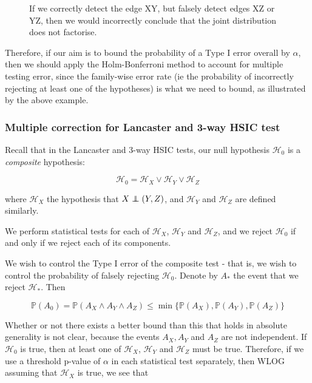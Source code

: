 \documentclass[12pt]{article}
\newcommand\independent{\protect\mathpalette{\protect\independenT}{\perp}}
\def\independenT#1#2{\mathrel{\rlap{$#1#2$}\mkern2mu{#1#2}}}
\numberwithin{claim}{section}
\numberwithin{lemma}{section}
\numberwithin{theorem}{section}
\begin{document}
\begin{figure}
\centering
{}
\caption{If we correctly detect the edge XY, but falsely detect edges XZ or YZ, then we would incorrectly conclude that the joint distribution does not factorise.\label{fig:example}}
\end{figure}

Therefore, if our aim is to bound the probability of a Type I error overall by $\alpha$, then we should apply the Holm-Bonferroni method to account for multiple testing error, since the family-wise error rate (ie the probability of incorrectly rejecting at least one of the hypotheses) is what we need to bound, as illustrated by the above example.

\subsubsection{Multiple correction for Lancaster and 3-way HSIC test}

Recall that in the Lancaster and 3-way HSIC tests, our null hypothesis $\mathcal{H}_0$ is a \emph{composite} hypothesis:

\[ \mathcal{H}_0 =  \mathcal{H}_X \lor \mathcal{H}_Y \lor \mathcal{H}_Z \]

where $\mathcal{H}_X$ the hypothesis that $X \independent (Y,Z)$, and $\mathcal{H}_Y$ and $\mathcal{H}_Z$ are defined similarly.

We perform statistical tests for each of $\mathcal{H}_X$, $\mathcal{H}_Y$ and $\mathcal{H}_Z$, and we reject $\mathcal{H}_0$ if and only if we reject each of its components.

We wish to control the Type I error of the composite test - that is, we wish to control the probability of falsely rejecting $\mathcal{H}_0$.  Denote by $A_*$ the event that we reject $\mathcal{H}_*$. Then

\[ \mathbb{P}(A_0) = \mathbb{P}(A_X \land A_Y \land A_Z) \leq \min\{\mathbb{P}(A_X),\mathbb{P}(A_Y), \mathbb{P}(A_Z) \} \]

Whether or not there exists a better bound than this that holds in absolute generality is not clear, because the events $A_X, A_Y$ and $A_Z$ are not independent. If $\mathcal{H}_0$ is true, then at least one of $\mathcal{H}_X$, $\mathcal{H}_Y$ and $\mathcal{H}_Z$ must be true. Therefore, if we use a threshold p-value of $\alpha$ in each statistical test separately, then WLOG assuming that $\mathcal{H}_X$ is true, we see that 
\end{document}
